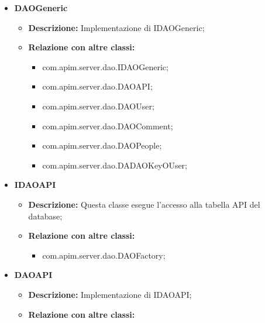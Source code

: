{{{{{\begin{itemize}
          \begin{itemize}
            \item \textbf{Descrizione:} Interfaccia che rappresenta un Data Access object generico;
            \item \textbf{Relazione con altre classi:}
            \begin{itemize}
              \item com.apim.server.dao.DAOGeneric;
            \end{itemize}
          \end{itemize}
          \item \textbf{DAOGeneric}
          \begin{itemize}
            \item \textbf{Descrizione:} Implementazione di IDAOGeneric;
            \item \textbf{Relazione con altre classi:}
            \begin{itemize}
              \item com.apim.server.dao.IDAOGeneric;
              \item com.apim.server.dao.DAOAPI;
              \item com.apim.server.dao.DAOUser;
              \item com.apim.server.dao.DAOComment;
              \item com.apim.server.dao.DAOPeople;
              \item com.apim.server.dao.DADAOKeyOUser;
            \end{itemize}
          \end{itemize}
          \item \textbf{IDAOAPI}
          \begin{itemize}
            \item \textbf{Descrizione:} Questa classe esegue l'accesso alla tabella API del database;
            \item \textbf{Relazione con altre classi:}
            \begin{itemize}
              \item com.apim.server.dao.DAOFactory;
            \end{itemize}
          \end{itemize}
          \item \textbf{DAOAPI}
          \begin{itemize}
            \item \textbf{Descrizione:} Implementazione di IDAOAPI;
            \item \textbf{Relazione con altre classi:}

\end{itemize}
\end{itemize}}}}}}
